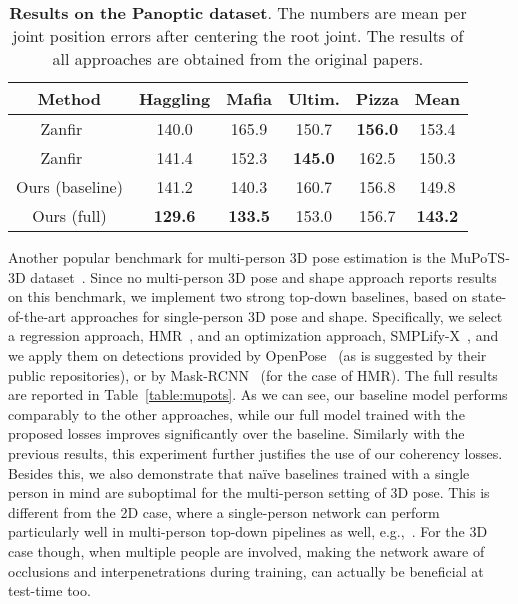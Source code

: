\begin{table}\centering
\footnotesize
	\begin{tabular}{c|c|c|c|c|c}
	\toprule
	Method & Haggling & Mafia & Ultim. & Pizza & Mean\\
	\midrule
	Zanfir~\etal~\cite{zanfir2018monocular} & 140.0 & 165.9 & 150.7 & \textbf{156.0} & 153.4\\ 
	Zanfir~\etal~\cite{zanfir2018deep} & 141.4 & 152.3 & \textbf{145.0} & 162.5 & 150.3\\ 	
	Ours (baseline) & 141.2 & 140.3 & 160.7 & 156.8 & 149.8\\	
	Ours (full) & \textbf{129.6} & \textbf{133.5} & 153.0 & 156.7 & \textbf{143.2}\\
	\bottomrule
	\end{tabular}
	\caption{\textbf{Results on the Panoptic dataset}. The numbers are mean per joint position errors after centering the root joint. The results of all approaches are obtained from the original papers.}
	\vspace{-2mm}
	\label{table:panoptic}
\end{table}

Another popular benchmark for multi-person 3D pose estimation is the MuPoTS-3D dataset~\cite{mehta2017monocular}. Since no multi-person 3D pose and shape approach reports results on this benchmark, we implement two strong top-down baselines, based on state-of-the-art approaches for single-person 3D pose and shape. Specifically, we select a regression approach, HMR~\cite{kanazawa2018end}, and an optimization approach, SMPLify-X~\cite{pavlakos2019expressive}, and we apply them on detections provided by OpenPose~\cite{cao2019openpose} (as is suggested by their public repositories), or by Mask-RCNN~\cite{he2017mask} (for the case of HMR). The full results are reported in Table~\ref{table:mupots}. As we can see, our baseline model performs comparably to the other approaches, while our full model trained with the proposed losses improves significantly over the baseline. Similarly with the previous results, this experiment further justifies the use of our coherency losses. Besides this, we also demonstrate that na\"ive baselines trained with a single person in mind are suboptimal for the multi-person setting of 3D pose. This is different from the 2D case, where a single-person network can perform particularly well in multi-person top-down pipelines as well, e.g.,~\cite{chen2018cascaded,sun2019deep,xiao2018simple}. For the 3D case though, when multiple people are involved, making the network aware of occlusions and interpenetrations during training, can actually be beneficial at test-time too.

